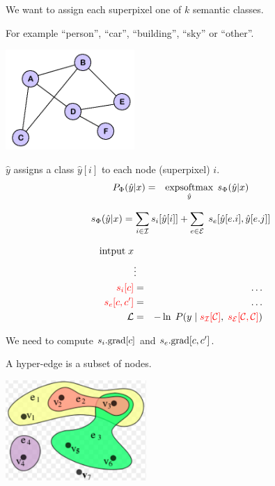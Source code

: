 {\vfill
We want to assign each superpixel one of $k$ semantic classes.

\vfill
For example ``person'', ``car'', ``building'', ``sky'' or ``other''.

\bigskip
\centerline{\includegraphics[height= 1.5in]{../images/Graph}}
\medskip
$\hat{y} $ assigns a class $\hat{y}[i]$ to each node (superpixel) $i$.
\bigskip
\bigskip
{\color{red}
\begin{eqnarray*}
P_\Phi(\hat{y}|x) & = & \operatorname*{expsoftmax}_{\hat{y}}\;s_\Phi(\hat{y}|x)
\end{eqnarray*}
}

\vfill
{\color{red} $$s_\Phi(\hat{y}|x) = \sum_{i \in {\cal I}} s_i[\hat{y}[i]] + \sum_{e \in {\cal E}}\;s_e[\hat{y}[e.i],\hat{y}[e.j]]$$}


\vfill
\begin{eqnarray*}
\mbox{intput}\; x \\
 & \vdots & \\
{\color{red} s_i[c]} & = & \ldots \\
{\color{red} s_e[c,c']} & = & \ldots \\
{\cal L} & = & - \ln\; P(y\;|\;{\color{red} s_{\cal I}[{\cal C}]},\;{\color{red} s_{\cal E}[{\cal C}, {\cal C}]})
\end{eqnarray*}

\vfill
We need to compute {\color{red} $s_i.\mathrm{grad}[c]$} and {\color{red} $s_e.\mathrm{grad}[c,c']$}.


A hyper-edge is a subset of nodes.

\vfill
\centerline{\includegraphics[height = 1.5in]{../images/HyperGraph}}


}
